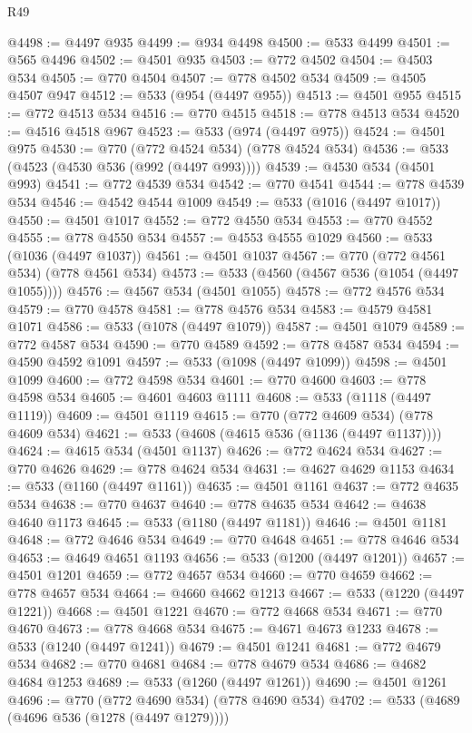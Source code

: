 \begin{lexlean}{R49}
\begin{coremodule}
@4498 := @4497 @935
@4499 := @934 @4498
@4500 := @533 @4499
@4501 := @565 @4496
@4502 := @4501 @935
@4503 := @772 @4502
@4504 := @4503 @534
@4505 := @770 @4504
@4507 := @778 @4502 @534
@4509 := @4505 @4507 @947
@4512 := @533 (@954 (@4497 @955))
@4513 := @4501 @955
@4515 := @772 @4513 @534
@4516 := @770 @4515
@4518 := @778 @4513 @534
@4520 := @4516 @4518 @967
@4523 := @533 (@974 (@4497 @975))
@4524 := @4501 @975
@4530 := @770 (@772 @4524 @534) (@778 @4524 @534)
@4536 := @533 (@4523 (@4530 @536 (@992 (@4497 @993))))
@4539 := @4530 @534 (@4501 @993)
@4541 := @772 @4539 @534
@4542 := @770 @4541
@4544 := @778 @4539 @534
@4546 := @4542 @4544 @1009
@4549 := @533 (@1016 (@4497 @1017))
@4550 := @4501 @1017
@4552 := @772 @4550 @534
@4553 := @770 @4552
@4555 := @778 @4550 @534
@4557 := @4553 @4555 @1029
@4560 := @533 (@1036 (@4497 @1037))
@4561 := @4501 @1037
@4567 := @770 (@772 @4561 @534) (@778 @4561 @534)
@4573 := @533 (@4560 (@4567 @536 (@1054 (@4497 @1055))))
@4576 := @4567 @534 (@4501 @1055)
@4578 := @772 @4576 @534
@4579 := @770 @4578
@4581 := @778 @4576 @534
@4583 := @4579 @4581 @1071
@4586 := @533 (@1078 (@4497 @1079))
@4587 := @4501 @1079
@4589 := @772 @4587 @534
@4590 := @770 @4589
@4592 := @778 @4587 @534
@4594 := @4590 @4592 @1091
@4597 := @533 (@1098 (@4497 @1099))
@4598 := @4501 @1099
@4600 := @772 @4598 @534
@4601 := @770 @4600
@4603 := @778 @4598 @534
@4605 := @4601 @4603 @1111
@4608 := @533 (@1118 (@4497 @1119))
@4609 := @4501 @1119
@4615 := @770 (@772 @4609 @534) (@778 @4609 @534)
@4621 := @533 (@4608 (@4615 @536 (@1136 (@4497 @1137))))
@4624 := @4615 @534 (@4501 @1137)
@4626 := @772 @4624 @534
@4627 := @770 @4626
@4629 := @778 @4624 @534
@4631 := @4627 @4629 @1153
@4634 := @533 (@1160 (@4497 @1161))
@4635 := @4501 @1161
@4637 := @772 @4635 @534
@4638 := @770 @4637
@4640 := @778 @4635 @534
@4642 := @4638 @4640 @1173
@4645 := @533 (@1180 (@4497 @1181))
@4646 := @4501 @1181
@4648 := @772 @4646 @534
@4649 := @770 @4648
@4651 := @778 @4646 @534
@4653 := @4649 @4651 @1193
@4656 := @533 (@1200 (@4497 @1201))
@4657 := @4501 @1201
@4659 := @772 @4657 @534
@4660 := @770 @4659
@4662 := @778 @4657 @534
@4664 := @4660 @4662 @1213
@4667 := @533 (@1220 (@4497 @1221))
@4668 := @4501 @1221
@4670 := @772 @4668 @534
@4671 := @770 @4670
@4673 := @778 @4668 @534
@4675 := @4671 @4673 @1233
@4678 := @533 (@1240 (@4497 @1241))
@4679 := @4501 @1241
@4681 := @772 @4679 @534
@4682 := @770 @4681
@4684 := @778 @4679 @534
@4686 := @4682 @4684 @1253
@4689 := @533 (@1260 (@4497 @1261))
@4690 := @4501 @1261
@4696 := @770 (@772 @4690 @534) (@778 @4690 @534)
@4702 := @533 (@4689 (@4696 @536 (@1278 (@4497 @1279))))

\end{coremodule}
\end{lexlean}
